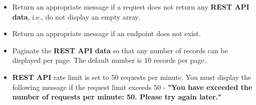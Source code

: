 \documentclass{article}
\begin{document}
\begin{itemize}
\begin{itemize}
		\item Return an appropriate message if a request does not return any \textbf{REST API data}, i.e., do not display an empty array.
		\item Return an appropriate message if an endpoint does not exist.
		\item Paginate the \textbf{REST API data} so that any number of records can be displayed per page. The default number is 10 records per page. 
		\item \textbf{REST API} rate limit is set to 50 requests per minute. You must display the following message if the request limit exceeds 50 - \textbf{"You have exceeded the number of requests per minute: 50. Please try again later."}
	\end{itemize}
\end{itemize}
\end{document}

